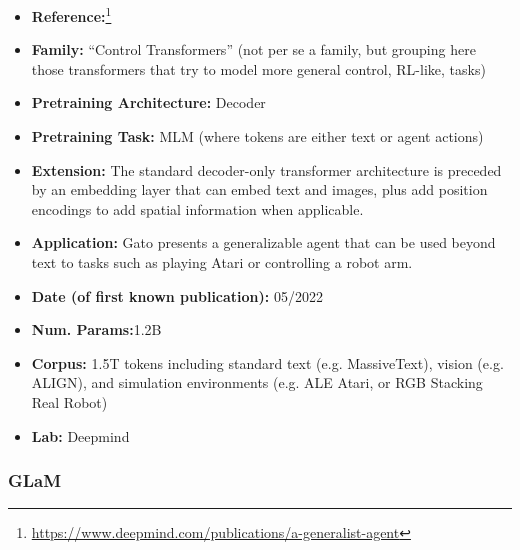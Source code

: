 \documentclass{article}
\begin{document}
            \begin{itemize}
                \item \textbf{Reference:}\footnote{\url{https://www.deepmind.com/publications/a-generalist-agent}}\cite{reed2022generalist}
                \item \textbf{Family:} “Control Transformers” (not per se a family, but grouping here those transformers that try to model more general control, RL-like, tasks) 
                \item \textbf{Pretraining Architecture:} Decoder
                \item \textbf{Pretraining Task:} MLM (where tokens are either text or agent actions)
                \item \textbf{Extension:} The standard decoder-only transformer architecture is preceded by an embedding layer that can embed text and images, plus add position encodings to add spatial information when applicable.  
                \item \textbf{Application:} Gato presents a generalizable agent that can be used beyond text to tasks such as playing Atari or controlling a robot arm.
                \item \textbf{Date (of first known publication):} 05/2022
                \item \textbf{Num. Params:}1.2B
                \item \textbf{Corpus:} 1.5T tokens including standard text (e.g. MassiveText), vision (e.g. ALIGN), and simulation environments (e.g. ALE Atari, or RGB Stacking Real Robot)
                \item \textbf{Lab:} Deepmind
            \end{itemize}

\subsubsection{GLaM}
\end{document}
